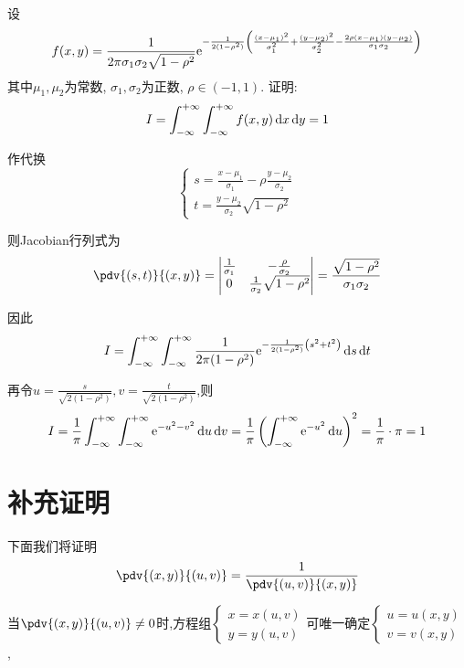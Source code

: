 \begin{example}
    设$$f(x,y) = \frac{1}{2 \pi \sigma_1 \sigma_2 \sqrt{1- \rho^2}} \mathrm{e}^{-\frac{1}{2(1-\rho^2)} \left( \frac{(x- \mu_1)^2}{\sigma_1^2} + \frac{(y- \mu_2)^2}{\sigma_2^2} - \frac{2\rho (x- \mu_1)(y- \mu_2)}{\sigma_1 \sigma_2} \right)}$$
    其中$\mu_1,\mu_2$为常数, $\sigma_1,\sigma_2$为正数, $\rho \in (-1,1)$.
    证明:$$I = \int_{-\infty}^{+\infty} \int_{-\infty}^{+\infty} f(x,y) \operatorname{d\!} x \operatorname{d\!} y = 1$$
\end{example}



\begin{solution}
    作代换$$\begin{cases}
        s = \frac{x- \mu_1}{\sigma_1} - \rho \frac{y- \mu_2}{\sigma_2}\\
        t = \frac{y- \mu_2}{\sigma_2} \sqrt{1- \rho^2}
    \end{cases}$$

    则Jacobian行列式为
    $$\pdv{(s,t)}{(x,y)} = \begin{vmatrix}
        \frac{1}{\sigma_1} & -\frac{\rho}{\sigma_2}\\
        0 & \frac{1}{\sigma_2}\sqrt{1- \rho^2}
    \end{vmatrix} = \frac{\sqrt{1- \rho^2}}{\sigma_1 \sigma_2}$$

    因此$$I = \int_{-\infty}^{+\infty} \int_{-\infty}^{+\infty} \frac{1}{2 \pi (1- \rho^2)} \mathrm{e}^{- \frac{1}{2(1- \rho^2)} \left( s^2 + t^2 \right)} \operatorname{d\!} s \operatorname{d\!} t$$

    再令$u = \frac{s}{\sqrt{2(1- \rho^2)}}, v = \frac{t}{\sqrt{2(1- \rho^2)}}$,则
    $$I = \frac{1}{\pi} \int_{-\infty}^{+\infty} \int_{-\infty}^{+\infty} \mathrm{e}^{-u^2 - v^2} \operatorname{d\!} u \operatorname{d\!} v= \frac{1}{\pi} \left( \int_{-\infty}^{+\infty} \mathrm{e}^{-u^2} \operatorname{d\!} u \right)^2 = \frac{1}{\pi} \cdot \pi = 1$$
\end{solution}


\section{补充证明}

下面我们将证明$$\pdv{(x,y)}{(u,v)} = \frac{1}{\pdv{(u,v)}{(x,y)}}$$

当$\pdv{(x,y)}{(u,v)} \neq 0 $时,方程组$\begin{cases}
    x = x(u,v)\\
    y = y(u,v)
\end{cases}$可唯一确定$\begin{cases}
    u = u(x,y)\\
    v = v(x,y)
\end{cases}$,

